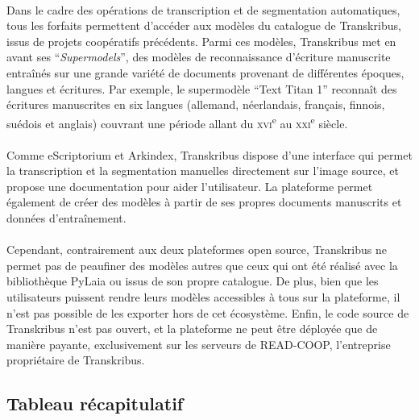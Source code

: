 \documentclass[a4paper,12pt,twoside]{book}
\begin{document}
\paragraph{}
Dans le cadre des opérations de transcription et de segmentation automatiques, tous les forfaits permettent d'accéder aux modèles du catalogue de Transkribus, issus de projets coopératifs précédents. Parmi ces modèles, Transkribus met en avant ses \enquote{\textit{Supermodels}}, des modèles de reconnaissance d'écriture manuscrite entraînés sur une grande variété de documents provenant de différentes époques, langues et écritures. Par exemple, le supermodèle \enquote{Text Titan 1} reconnaît des écritures manuscrites en six langues (allemand, néerlandais, français, finnois, suédois et anglais) couvrant une période allant du \textsc{xvi}\textsuperscript{e} au \textsc{xxi}\textsuperscript{e} siècle. 

\paragraph{}
Comme eScriptorium et Arkindex, Transkribus dispose d’une interface qui permet la transcription et la segmentation manuelles directement sur l’image source, et propose une documentation pour aider l’utilisateur. La plateforme permet également de créer des modèles à partir de ses propres documents manuscrits et données d'entraînement.

\paragraph{}
Cependant, contrairement aux deux plateformes open source, Transkribus ne permet pas de peaufiner des modèles autres que ceux qui ont été réalisé avec la bibliothèque PyLaia ou issus de son propre catalogue. De plus, bien que les utilisateurs puissent rendre leurs modèles accessibles à tous sur la plateforme, il n’est pas possible de les exporter hors de cet écosystème. Enfin, le code source de Transkribus n'est pas ouvert, et la plateforme ne peut être déployée que de manière payante, exclusivement sur les serveurs de READ-COOP, l'entreprise propriétaire de Transkribus.

		
		\subsection{Tableau récapitulatif}
		
\end{document}
